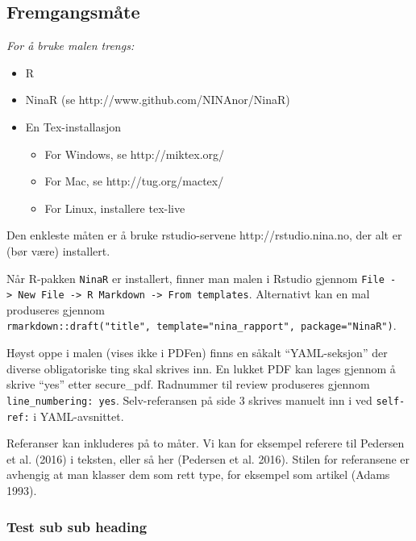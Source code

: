 \documentclass[11pt, a4paper]{article}
\providecommand{\tightlist}{%
  \setlength{\itemsep}{0pt}\setlength{\parskip}{0pt}}
\begin{document}
\hypertarget{fremgangsmuxe5te}{%
\subsection{Fremgangsmåte}\label{fremgangsmuxe5te}}

\emph{For å bruke malen trengs:}

\begin{itemize}
\tightlist
\item
  R
\item
  NinaR (se http://www.github.com/NINAnor/NinaR)
\item
  En Tex-installasjon

  \begin{itemize}
  \tightlist
  \item
    For Windows, se http://miktex.org/
  \item
    For Mac, se http://tug.org/mactex/
  \item
    For Linux, installere tex-live
  \end{itemize}
\end{itemize}

Den enkleste måten er å bruke rstudio-servene http://rstudio.nina.no,
der alt er (bør være) installert.

Når R-pakken \texttt{NinaR} er installert, finner man malen i Rstudio
gjennom
\texttt{File\ -\textgreater{}\ New\ File\ -\textgreater{}\ R\ Markdown\ -\textgreater{}\ From\ templates}.
Alternativt kan en mal produseres gjennom
\texttt{rmarkdown::draft("title",\ template="nina\_rapport",\ package="NinaR")}.

Høyst oppe i malen (vises ikke i PDFen) finns en såkalt ``YAML-seksjon''
der diverse obligatoriske ting skal skrives inn. En lukket PDF kan lages
gjennom å skrive ``yes'' etter secure\_pdf. Radnummer til review
produseres gjennom \texttt{line\_numbering:\ yes}. Selv-referansen på
side 3 skrives manuelt inn i ved \texttt{self-ref:} i YAML-avsnittet.

Referanser kan inkluderes på to måter. Vi kan for eksempel referere til
Pedersen et al. (2016) i teksten, eller så her (Pedersen et al. 2016).
Stilen for referansene er avhengig at man klasser dem som rett type, for
eksempel som artikel (Adams 1993).

\hypertarget{test-sub-sub-heading}{%
\subsubsection{Test sub sub heading}\label{test-sub-sub-heading}}
\end{document}
